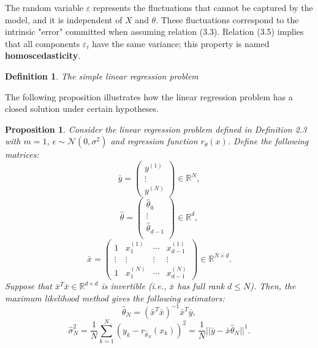 \documentclass{report}
\newtheorem{definition}{Definition}[chapter]
\newtheorem{proposition}{Proposition}[chapter]
\begin{document}
The random variable $\varepsilon$ represents the fluctuations that cannot be captured by the model, and it is independent of $X$ and $\theta$. These fluctuations correspond to the intrinsic "error" committed when assuming relation (3.3). Relation (3.5) implies that all components $\varepsilon_i$ have the same variance; this property is named \textbf{homoscedasticity}.

\begin{definition}
The simple linear regression problem
\end{definition}

The following proposition illustrates how the linear regression problem has a closed solution under certain hypotheses.
\begin{proposition}
Consider the linear regression problem defined in Definition 2.3 with $m=1$, $\epsilon \sim \mathcal{N}(0, \sigma^2)$ and regression function $r_\theta(x)$. Define the following matrices:
\begin{equation}
\bar{y}=\begin{pmatrix}y^{(1)}\\
\vdots\\
y^{(N)}
\end{pmatrix} \in \mathbb{R}^N,
\end{equation}
\begin{equation}
\hat{\theta} = \begin{pmatrix}\hat{\theta}_0\\
\vdots\\
\hat{\theta}_{d-1}\\
\end{pmatrix} \in \mathbb{R}^{d},
\end{equation}
\begin{equation}
\bar{x} = \begin{pmatrix}
1 & x^{(1)}_1 & \cdots & x^{(1)}_{d-1} \\
\vdots & \vdots  & \vdots & \vdots \\
1 & x^{(N)}_1  &\cdots & x^{(N)}_{d-1}
\end{pmatrix} \in \mathbb{R}^{N \times d}.
\end{equation}
Suppose that $\bar{x}^T\bar{x} \in \mathbb{R}^{d \times d}$ is invertible (i.e., $\bar{x}$ has full rank $d \leq N$).
Then, the maximum likelihood method gives the following estimators:
\begin{equation}
\hat{\theta}_N = (\bar{x}^T\bar{x})^{-1}\bar{x}^T\bar{y},
\end{equation}
\begin{equation}
\hat{\sigma}_N^2 = \frac{1}{N}\sum_{k=1}^{N}(y_k-r_{\hat{\theta}_N}(x_k))^2 = \frac{1}{N}||\bar{y} -\bar{x}\hat{\theta}_N||^1.
\end{equation}
\end{proposition}
\end{document}
